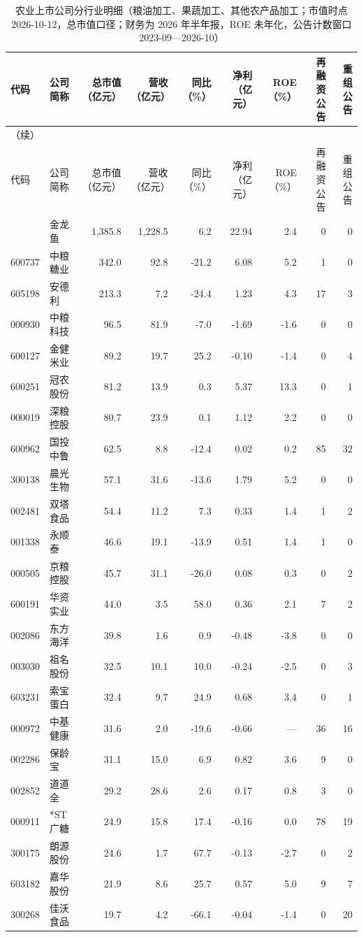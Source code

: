 \begingroup\scriptsize\setlength{\tabcolsep}{2pt}
\begin{longtable}{@{}llrrrrrrr@{}}
\caption{农业上市公司分行业明细（粮油加工、果蔬加工、其他农产品加工；市值时点 2026-10-12，总市值口径；财务为 2026 年半年报，ROE 未年化，公告计数窗口 2023-09---2026-10）}\label{tab:comp-processing}\\
\toprule
代码 & 公司简称 & 总市值（亿元） & 营收（亿元） & 同比（\%） & 净利（亿元） & ROE（\%） & 再融资公告 & 重组公告 \\
\midrule
\endfirsthead
\multicolumn{9}{l}{\small（续）}\\
\toprule
代码 & 公司简称 & 总市值（亿元） & 营收（亿元） & 同比（\%） & 净利（亿元） & ROE（\%） & 再融资公告 & 重组公告 \\
\midrule
\endhead
\bottomrule
\endlastfoot
300999 & 金龙鱼 & 1,385.8 & 1,228.5 & 6.2 & 22.94 & 2.4 & 0 & 0 \\
600737 & 中粮糖业 & 342.0 & 92.8 & -21.2 & 6.08 & 5.2 & 1 & 0 \\
605198 & 安德利 & 213.3 & 7.2 & -24.4 & 1.23 & 4.3 & 17 & 3 \\
000930 & 中粮科技 & 96.5 & 81.9 & -7.0 & -1.69 & -1.6 & 0 & 0 \\
600127 & 金健米业 & 89.2 & 19.7 & 25.2 & -0.10 & -1.4 & 0 & 4 \\
600251 & 冠农股份 & 81.2 & 13.9 & 0.3 & 5.37 & 13.3 & 0 & 1 \\
000019 & 深粮控股 & 80.7 & 23.9 & 0.1 & 1.12 & 2.2 & 0 & 0 \\
600962 & 国投中鲁 & 62.5 & 8.8 & -12.4 & 0.02 & 0.2 & 85 & 32 \\
300138 & 晨光生物 & 57.1 & 31.6 & -13.6 & 1.79 & 5.2 & 0 & 0 \\
002481 & 双塔食品 & 54.4 & 11.2 & 7.3 & 0.33 & 1.4 & 1 & 2 \\
001338 & 永顺泰 & 46.6 & 19.1 & -13.9 & 0.51 & 1.4 & 1 & 0 \\
000505 & 京粮控股 & 45.7 & 31.1 & -26.0 & 0.08 & 0.3 & 0 & 2 \\
600191 & 华资实业 & 44.0 & 3.5 & 58.0 & 0.36 & 2.1 & 7 & 2 \\
002086 & 东方海洋 & 39.8 & 1.6 & 0.9 & -0.48 & -3.8 & 0 & 0 \\
003030 & 祖名股份 & 32.5 & 10.1 & 10.0 & -0.24 & -2.5 & 0 & 3 \\
603231 & 索宝蛋白 & 32.4 & 9.7 & 24.9 & 0.68 & 3.4 & 0 & 1 \\
000972 & 中基健康 & 31.6 & 2.0 & -19.6 & -0.66 & — & 36 & 16 \\
002286 & 保龄宝 & 31.1 & 15.0 & 6.9 & 0.82 & 3.6 & 9 & 0 \\
002852 & 道道全 & 29.2 & 28.6 & 2.6 & 0.17 & 0.8 & 3 & 0 \\
000911 & *ST广糖 & 24.9 & 15.8 & 17.4 & -0.16 & 0.0 & 78 & 19 \\
300175 & 朗源股份 & 24.6 & 1.7 & 67.7 & -0.13 & -2.7 & 0 & 2 \\
603182 & 嘉华股份 & 21.9 & 8.6 & 25.7 & 0.57 & 5.0 & 9 & 7 \\
300268 & 佳沃食品 & 19.7 & 4.2 & -66.1 & -0.04 & -1.4 & 0 & 20 \\
\end{longtable}
\endgroup
